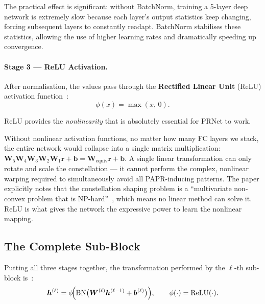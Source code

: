 The practical effect is significant: without BatchNorm, training a 5-layer
deep network is extremely slow because each layer's output statistics keep
changing, forcing subsequent layers to constantly readapt.  BatchNorm
stabilises these statistics, allowing the use of higher learning rates
and dramatically speeding up convergence.

\paragraph{Stage 3 --- ReLU Activation.}
After normalisation, the values pass through the \textbf{Rectified Linear Unit}
(ReLU) activation function~\cite{kim2017novel}:
\begin{equation}
    \phi(x) = \max(x,\, 0).
    \label{eq:prnet_relu}
\end{equation}

ReLU provides the \emph{nonlinearity} that is absolutely essential for
PRNet to work.

\begin{keyinsight}
    Without nonlinear activation functions, no matter how many FC layers
    we stack, the entire network would collapse into a single matrix
    multiplication: $\bm{W}_5 \bm{W}_4 \bm{W}_3 \bm{W}_2 \bm{W}_1
    \bm{r} + \bm{b} = \bm{W}_{\mathrm{equiv}} \bm{r} + \bm{b}$.
    A single linear transformation can only rotate and scale the
    constellation --- it cannot perform the complex, nonlinear
    warping required to simultaneously avoid all PAPR-inducing
    patterns.  The paper explicitly notes that the constellation
    shaping problem is a ``multivariate non-convex problem that is
    NP-hard''~\cite{kim2017novel}, which means no linear method can
    solve it.  ReLU is what gives the network the expressive power to
    learn the nonlinear mapping.
\end{keyinsight}


\subsection{The Complete Sub-Block}

Putting all three stages together, the transformation performed by the
$\ell$-th sub-block is~\cite{kim2017novel}:
\begin{equation}
    \bm{h}^{(\ell)}
    = \phi\!\Bigl(
        \mathrm{BN}\bigl(\bm{W}^{(\ell)}\bm{h}^{(\ell-1)}
        + \bm{b}^{(\ell)}\bigr)
    \Bigr),
    \qquad \phi(\cdot) = \mathrm{ReLU}(\cdot).
    \label{eq:prnet_subblock}
\end{equation}


